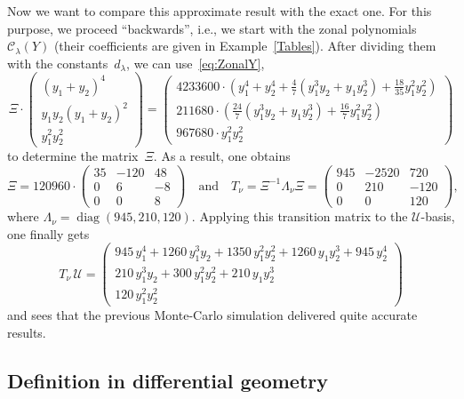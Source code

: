 \documentclass[smallextended]{svjour3}
\DeclareMathOperator{\diag}{diag}
\begin{document}
\begin{example}
  Now we want to compare this approximate result with the exact one.  For this
  purpose, we proceed ``backwards'', i.e., we start with the zonal polynomials
  $\mathcal{C}_\lambda(Y)$ (their coefficients are given in
  Example~\ref{Tables}).  After dividing them with the constants~$d_\lambda$,
  we can use~\eqref{eq:ZonalY},
  \[
    \Xi \cdot \begin{pmatrix} (y_1+y_2)^4 \\ y_1y_2(y_1+y_2)^2 \\ y_1^2y_2^2 \end{pmatrix} =
    \begin{pmatrix}
      4233600 \cdot \left(y_1^4+y_2^4 + \frac{4}{7}(y_1^3y_2+y_1y_2^3) + \frac{18}{35}y_1^2y_2^2 \right) \\
      211680 \cdot \left(\frac{24}{7}(y_1^3y_2+y_1y_2^3) + \frac{16}{7}y_1^2y_2^2\right) \\
      967680 \cdot y_1^2 y_2^2
    \end{pmatrix}
  \]
  to determine the matrix~$\Xi$. As a result, one obtains
  \[
    \Xi = 120960 \cdot
    \begin{pmatrix}
      35 & -120 & 48 \\
      0 & 6 & -8 \\
      0 & 0 & 8
    \end{pmatrix}
    \quad\text{and}\quad
    T_\nu = \Xi^{-1}\Lambda_{\nu}\Xi =
    \begin{pmatrix}
       945 & -2520 & 720 \\
       0 & 210 & -120 \\
       0 & 0 & 120
    \end{pmatrix},
  \]
  where $\Lambda_{\nu}=\diag(945,210,120)$. Applying this transition matrix
  to the $\mathcal{U}$-basis, one finally gets
  \[
    T_\nu \, \mathcal{U} =
    \begin{pmatrix}
      945\,y_1^4 + 1260\,y_1^3y_2 + 1350\,y_1^2y_2^2 + 1260\,y_1y_2^3 + 945\,y_2^4 \\
      210\,y_1^3y_2 + 300\,y_1^2y_2^2 + 210\,y_1y_2^3 \\
      120\,y_1^2y_2^2
    \end{pmatrix}
  \]
  and sees that the previous Monte-Carlo simulation delivered quite
  accurate results.
\end{example}


\subsection{Definition in differential geometry}
\end{document}
